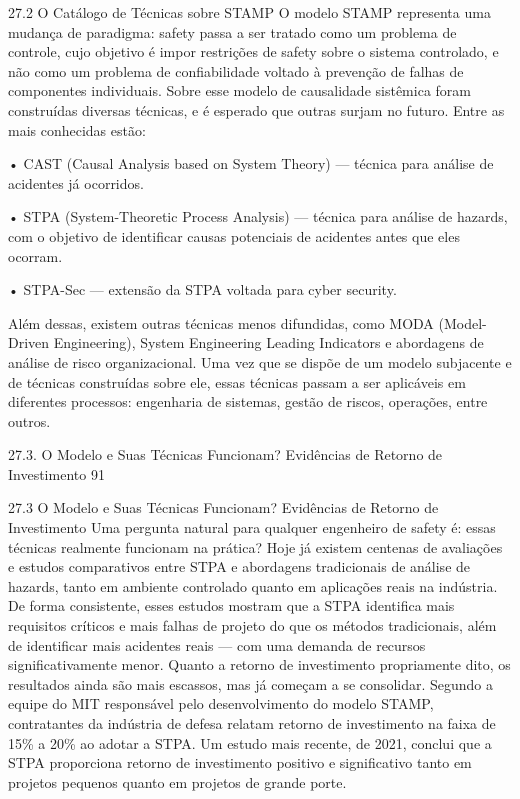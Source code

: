 27.2 O Catálogo de Técnicas sobre STAMP O modelo STAMP representa uma mudança de paradigma: safety passa a ser tratado como um problema de controle, cujo objetivo é impor restrições de safety sobre o sistema controlado, e não como um problema de confiabilidade voltado à prevenção de falhas de componentes individuais. Sobre esse modelo de causalidade sistêmica foram construídas diversas técnicas, e é esperado que outras surjam no futuro. Entre as mais conhecidas estão:

• CAST (Causal Analysis based on System Theory) — técnica para análise de acidentes já ocorridos.

• STPA (System-Theoretic Process Analysis) — técnica para análise de hazards, com o objetivo de identificar causas potenciais de acidentes antes que eles ocorram.

• STPA-Sec — extensão da STPA voltada para cyber security.

Além dessas, existem outras técnicas menos difundidas, como MODA (Model- Driven Engineering), System Engineering Leading Indicators e abordagens de análise de risco organizacional. Uma vez que se dispõe de um modelo subjacente e de técnicas construídas sobre ele, essas técnicas passam a ser aplicáveis em diferentes processos: engenharia de sistemas, gestão de riscos, operações, entre outros.

27.3. O Modelo e Suas Técnicas Funcionam? Evidências de Retorno de Investimento 91

27.3 O Modelo e Suas Técnicas Funcionam? Evidências de Retorno de Investimento Uma pergunta natural para qualquer engenheiro de safety é: essas técnicas realmente funcionam na prática? Hoje já existem centenas de avaliações e estudos comparativos entre STPA e abordagens tradicionais de análise de hazards, tanto em ambiente controlado quanto em aplicações reais na indústria. De forma consistente, esses estudos mostram que a STPA identifica mais requisitos críticos e mais falhas de projeto do que os métodos tradicionais, além de identificar mais acidentes reais — com uma demanda de recursos significativamente menor. Quanto a retorno de investimento propriamente dito, os resultados ainda são mais escassos, mas já começam a se consolidar. Segundo a equipe do MIT responsável pelo desenvolvimento do modelo STAMP, contratantes da indústria de defesa relatam retorno de investimento na faixa de 15\% a 20\% ao adotar a STPA. Um estudo mais recente, de 2021, conclui que a STPA proporciona retorno de investimento positivo e significativo tanto em projetos pequenos quanto em projetos de grande porte.

